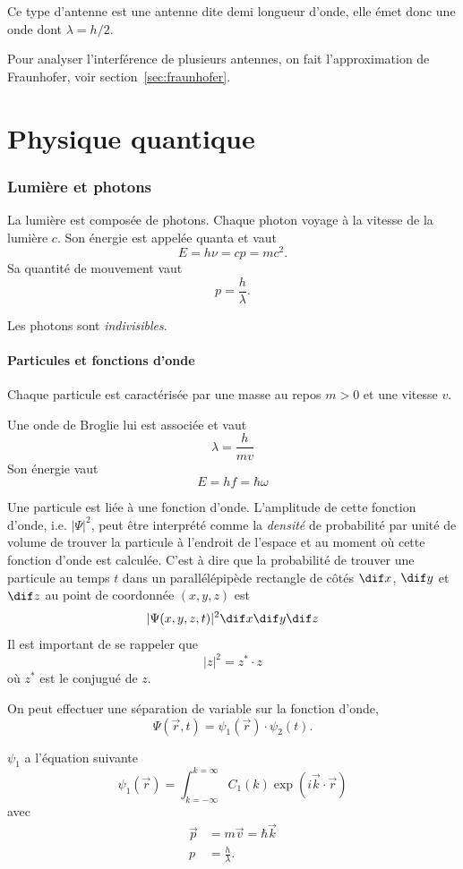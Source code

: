 Ce type d'antenne est une antenne dite demi longueur d'onde, elle émet
donc une onde dont $\lambda = h/2$.

Pour analyser l'interférence de plusieurs antennes,
on fait l'approximation de Fraunhofer, voir section~\ref{sec:fraunhofer}.



\part{Physique quantique}
\section{Lumière et photons}
La lumière est composée de photons.
Chaque photon voyage à la vitesse de la lumière $c$.
Son énergie est appelée quanta et vaut
\[ E = h\nu = cp = mc^2. \]
Sa quantité de mouvement vaut
\[ p = \frac{h}{\lambda}. \]

Les photons sont \emph{indivisibles}.

\subsection{Particules et fonctions d'onde}
Chaque particule est caractérisée par une masse au repos $m > 0$
et une vitesse $v$.

Une onde de Broglie lui est associée et vaut
\[ \lambda = \frac{h}{mv} \]
Son énergie vaut
\[ E = hf = \hbar \omega \]

Une particule est liée à une fonction d'onde.
L'amplitude de cette fonction d'onde, i.e. $|\Psi|^2$, peut être interprété
comme la \emph{densité} de probabilité par unité de volume de trouver
la particule à l'endroit de l'espace et au moment où cette fonction
d'onde est calculée.
C'est à dire que la probabilité de trouver une particule
au temps $t$ dans un parallélépipède rectangle de côtés
$\dif x$, $\dif y$ et $\dif z$ au point de coordonnée $(x, y, z)$ est
\[ |\Psi(x, y, z, t)|^2 \dif x \dif y \dif z \]
Il est important de se rappeler que
\[ |z|^2 = z^{*} \cdot z \]
où $z^{*}$ est le conjugué de $z$.

On peut effectuer une séparation de variable sur la fonction d'onde,
\[ \Psi(\vec{r}, t) = \psi_1(\vec{r}) \cdot \psi_2(t). \]

$\psi_1$ a l'équation suivante
\[ \psi_1(\vec{r}) = \int_{k=-\infty}^{k=\infty}
C_1(k) \exp\left(i\vec{k}\cdot\vec{r}\right) \]
avec
\begin{align}
  \label{eq:pvk}
  \vec{p} & = m\vec{v} = \hbar \vec{k}\\
  \nonumber
  p & = \frac{h}{\lambda}.
\end{align}

